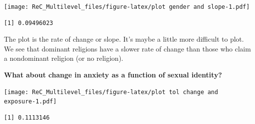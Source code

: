 \documentclass[
  english,
]{book}
\newenvironment{Shaded}{\begin{snugshade}}{\end{snugshade}}
\newcommand{\AttributeTok}[1]{\textcolor[rgb]{0.77,0.63,0.00}{#1}}
\newcommand{\FunctionTok}[1]{\textcolor[rgb]{0.00,0.00,0.00}{#1}}
\newcommand{\NormalTok}[1]{#1}
\newcommand{\SpecialCharTok}[1]{\textcolor[rgb]{0.00,0.00,0.00}{#1}}
\newcommand{\StringTok}[1]{\textcolor[rgb]{0.31,0.60,0.02}{#1}}
\begin{document}
\begin{Shaded}
\end{Shaded}

\texttt{[image: ReC\_Multilevel\_files/figure-latex/plot gender and slope-1.pdf]}

\begin{Shaded}
\end{Shaded}

\begin{verbatim}
[1] 0.09496023
\end{verbatim}

The plot is the rate of change or slope. It's maybe a little more difficult to plot. We see that dominant religions have a slower rate of change than those who claim a nondominant religion (or no religion).

\textbf{What about change in anxiety as a function of sexual identity?}

\begin{Shaded}
\end{Shaded}

\texttt{[image: ReC\_Multilevel\_files/figure-latex/plot tol change and exposure-1.pdf]}

\begin{Shaded}
\end{Shaded}

\begin{verbatim}
[1] 0.1113146
\end{verbatim}
\end{document}
